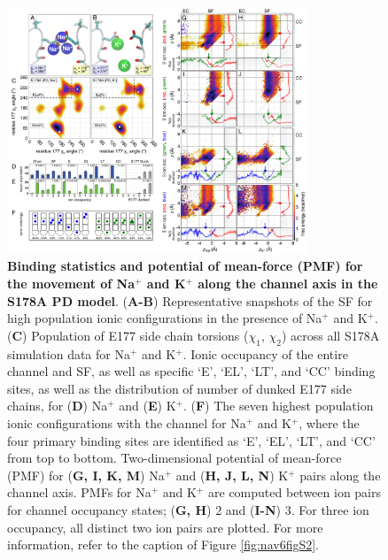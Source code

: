\begin{refsection}
\begin{figure}[!ptb]
\centering
\includegraphics[width=0.8\textwidth]{nav6/Nav6FigS4}
\caption[Binding statistics and potential of mean-force (PMF) for the movement of Na$^+$ and K$^+$ along the channel axis in the S178A PD model]{ \textbf{Binding statistics and potential of mean-force (PMF) for the movement of Na$^+$ and K$^+$ along the channel axis in the S178A PD model}. (\textbf{A-B}) Representative snapshots of the SF for high population ionic configurations in the presence of Na$^+$ and K$^+$. (\textbf{C}) Population of E177 side chain torsions ($\chi_1$, $\chi_2$) across all S178A simulation data for Na$^+$ and K$^+$. Ionic occupancy of the entire channel and SF, as well as specific `E', `EL', `LT', and `CC' binding sites, as well as the distribution of number of dunked E177 side chains, for (\textbf{D}) Na$^+$ and (\textbf{E}) K$^+$. (\textbf{F}) The seven highest population ionic configurations with the channel for Na$^+$ and K$^+$, where the four primary binding sites are identified as `E', `EL', `LT', and `CC' from top to bottom. Two-dimensional potential of mean-force (PMF) for (\textbf{G, I, K, M}) Na$^+$ and (\textbf{H, J, L, N}) K$^+$ pairs along the channel axis. PMFs for Na$^+$ and K$^+$ are computed between ion pairs for channel occupancy states; (\textbf{G, H}) 2 and (\textbf{I-N}) 3. For three ion occupancy, all distinct two ion pairs are plotted. For more information, refer to the caption of Figure \ref{fig:nav6figS2}.}
\label{fig:nav6figS4}
\end{figure}


\end{refsection}

